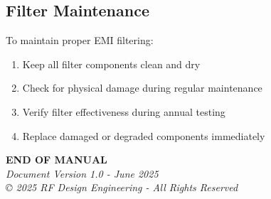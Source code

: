 \documentclass[11pt,a4paper]{article}
\begin{document}
\subsection{Filter Maintenance}
To maintain proper EMI filtering:
\begin{enumerate}
    \item Keep all filter components clean and dry
    \item Check for physical damage during regular maintenance
    \item Verify filter effectiveness during annual testing
    \item Replace damaged or degraded components immediately
\end{enumerate}

\vfill
\begin{center}
\textbf{END OF MANUAL}\\
\textit{Document Version 1.0 - June 2025}\\
\textit{© 2025 RF Design Engineering - All Rights Reserved}
\end{center}
\end{document}
